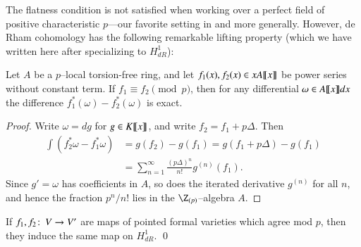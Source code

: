 

The flatness condition is not satisfied when working over a perfect field of positive characteristic $p$---our favorite setting in  and  more generally.  However, de Rham cohomology has the following remarkable lifting property (which we have written here after specializing to $H^1_{dR}$):

\begin{theorem}
Let $A$ be a $p$--local torsion-free ring, and let $f_1(x), f_2(x) \in x A\llbracket{x}\rrbracket$ be power series without constant term.  If $f_1 \equiv f_2 \pmod{p}$, then for any differential $\omega \in A\llbracket{x}\rrbracket dx$ the difference $f_1^*(\omega) - f_2^*(\omega)$ is exact.
\end{theorem}
\begin{proof}
Write $\omega = dg$ for $g \in K\llbracket{x}\rrbracket$, and write $f_2 = f_1 + p\Delta$.  Then
\begin{align*}
\int \left( f_2^* \omega - f_1^* \omega \right) & = g(f_2) - g(f_1) = g(f_1 + p\Delta) - g(f_1) \\
& = \sum_{n = 1}^\infty \frac{(p\Delta)^n}{n!} g^{(n)}(f_1).
\end{align*}
Since $g' = \omega$ has coefficients in $A$, so does the iterated derivative $g^{(n)}$ for all $n$, and hence the fraction $p^n/n!$ lies in the $\Z_{(p)}$--algebra $A$.
\end{proof}

\begin{corollary}\label{H1dRIsCrystalline}
If $f_1, f_2\colon\thinspace V \to V'$ are maps of pointed formal varieties which agree mod $p$, then they induce the same map on $H^1_{dR}$. \qed
\end{corollary}

